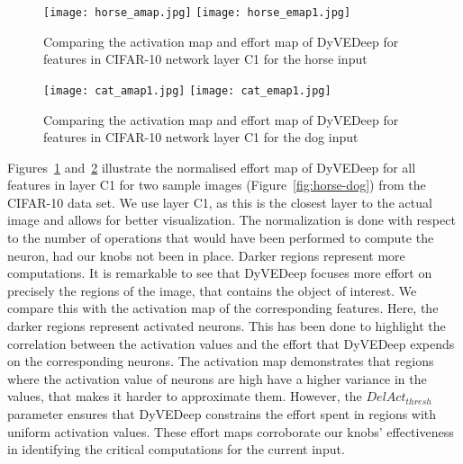 \documentclass{article} %
\begin{document}
\begin{figure}[htb]
\begin{center}
\texttt{[image: horse\_amap.jpg]} \texttt{[image: horse\_emap1.jpg]}
\end{center}
\caption{Comparing the activation map and effort map of DyVEDeep for features in CIFAR-10 network layer C1 for the horse input}
\label{fig:horsemap}
\end{figure}

\begin{figure}[htb]
\begin{center}
\texttt{[image: cat\_amap1.jpg]} \texttt{[image: cat\_emap1.jpg]}
\end{center}
\caption{Comparing the activation map and effort map of DyVEDeep for features in CIFAR-10 network layer C1 for the dog input}
\label{fig:catmap}
\end{figure}

Figures~\ref{fig:horsemap} and~\ref{fig:catmap} illustrate the normalised effort map of DyVEDeep for all features in layer C1 for two sample images (Figure~\ref{fig:horse-dog}) from the CIFAR-10 data set. We use layer C1, as this is the closest layer to the actual image and allows for better visualization. The normalization is done with respect to the number of operations that would have been performed to compute the neuron, had our knobs not been in place. Darker regions represent more computations. It is remarkable to see that DyVEDeep focuses more effort on precisely the regions of the image, that contains the object of interest. We compare this with the activation map of the corresponding features. Here, the darker regions represent activated neurons. This has been done to highlight the correlation between the activation values and the effort that DyVEDeep expends on the corresponding neurons. 
The activation map demonstrates that regions where the activation value of neurons are high have a higher variance in the values, that makes it harder to approximate them. However, the $DelAct_{thresh}$ parameter ensures that DyVEDeep constrains the effort spent in regions with uniform activation values. These effort maps corroborate our knobs' effectiveness in identifying the critical computations for the current input.
\end{document}

